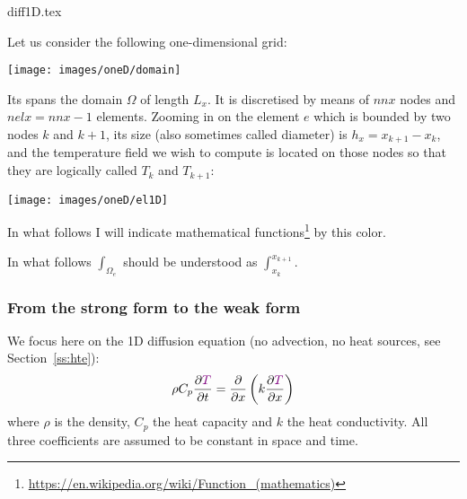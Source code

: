 \begin{flushright} {\tiny {\color{gray} diff1D.tex}} \end{flushright}

Let us consider the following one-dimensional grid: 
\begin{center}
\texttt{[image: images/oneD/domain]}
\end{center}
Its spans the domain $\Omega$ of length $L_x$. 
It is discretised by means of 
$nnx$ nodes and $nelx=nnx-1$ elements.
Zooming in on the element $e$ which is bounded by two nodes $k$ and $k+1$,
its size (also sometimes called diameter) is $h_x=x_{k+1}-x_k$, 
and the temperature field we wish to compute is located on those 
nodes so that they are logically called $T_k$ and $T_{k+1}$:

\begin{center}
\texttt{[image: images/oneD/el1D]}
\end{center}

\begin{remark}
In what follows I will indicate 
mathematical functions\footnote{\url{https://en.wikipedia.org/wiki/Function_(mathematics)}} 
by this {\color{violet} color}.
\end{remark}

\begin{remark}
In what follows $\int_{\Omega_e}$ should be understood as $\int_{x_k}^{x_{k+1}}$.
\end{remark}


\subsubsection{From the strong form to the weak form}

We focus here on the 1D diffusion equation (no advection, no heat sources, see Section~\ref{ss:hte}):
\begin{equation}
\rho C_p \frac{\partial {\color{violet}T}}{\partial t} 
= \frac{\partial }{\partial x} \left( k \frac{\partial {\color{violet}T}}{\partial x}  \right)
\end{equation}
where $\rho$ is the density, $C_p$ the heat capacity and $k$ the heat conductivity. All three coefficients
are assumed to be constant in space and time.

